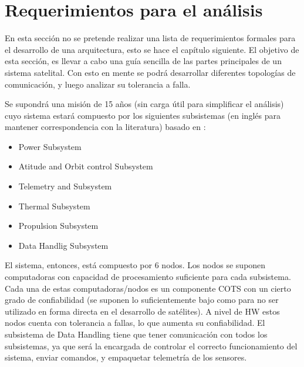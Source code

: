 \section{Requerimientos para el análisis}
En esta sección no se pretende realizar una lista de requerimientos formales para el desarrollo de una arquitectura, esto se hace el capítulo siguiente. El objetivo de esta sección, es llevar a cabo una guía sencilla de las partes principales de un sistema satelital. Con esto en mente se podrá desarrollar diferentes topologías de comunicación, y luego analizar su tolerancia a falla.

Se supondrá una misión de 15 años (sin carga útil para simplificar el análisis) cuyo sistema estará compuesto por los siguientes subsistemas (en inglés para mantener correspondencia con la literatura) basado en \cite{Fontescue03}:
\begin{itemize}
\item Power Subsystem
\item Atitude and Orbit control Subsystem
\item Telemetry and Subsystem
\item Thermal Subsystem
\item Propulsion Subsystem
\item Data Handlig Subsystem
\end{itemize}

El sistema, entonces, está compuesto por 6 nodos. Los nodos se suponen computadoras con capacidad de procesamiento suficiente para cada subsistema. Cada una de estas computadoras/nodos es un componente COTS con un cierto grado de confiabilidad (se suponen lo suficientemente bajo como para no ser utilizado en forma directa en el desarrollo de satélites). A nivel de \ac{HW} estos nodos cuenta con tolerancia a fallas, lo que aumenta su confiabilidad. El subsistema de Data Handling tiene que tener comunicación con todos los subsistemas, ya que será la encargada de controlar el correcto funcionamiento del sistema, enviar comandos, y empaquetar telemetría de los sensores.



